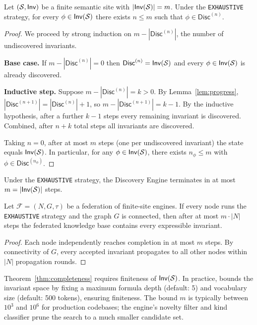 \documentclass[11pt]{article}
\newcommand{\Fed}{\mathcal{F}}             %
\newcommand{\Disc}{\mathsf{Disc}}          %
\newcommand{\Inv}{\mathsf{Inv}}            %
\newcommand{\alg}[1]{\texttt{\small #1}}   %
\begin{document}
\begin{theorem}\label{thm:completeness}
Let $(\Site, \Inv)$ be a finite semantic site with $|\Inv(\Site)| = m$.
Under the \alg{EXHAUSTIVE} strategy, for every $\phi \in \Inv(\Site)$
there exists $n \leq m$ such that $\phi \in \Disc^{(n)}$.
\end{theorem}
\begin{proof}
We proceed by strong induction on $m - |\Disc^{(n)}|$, the
number of undiscovered invariants.

\textbf{Base case.} If $m - |\Disc^{(n)}| = 0$ then
$\Disc^{(n)} = \Inv(\Site)$ and every $\phi \in \Inv(\Site)$ is
already discovered.

\textbf{Inductive step.} Suppose $m - |\Disc^{(n)}| = k > 0$.
By Lemma~\ref{lem:progress}, $|\Disc^{(n+1)}| = |\Disc^{(n)}| + 1$,
so $m - |\Disc^{(n+1)}| = k - 1$.  By the inductive hypothesis,
after a further $k - 1$ steps every remaining invariant is discovered.
Combined, after $n + k$ total steps all invariants are discovered.

Taking $n = 0$, after at most $m$ steps (one per undiscovered invariant)
the state equals $\Inv(\Site)$.  In particular, for any
$\phi \in \Inv(\Site)$, there exists $n_\phi \leq m$ with
$\phi \in \Disc^{(n_\phi)}$.
\end{proof}

\begin{corollary}\label{cor:termination}
Under the \alg{EXHAUSTIVE} strategy, the Discovery Engine terminates
in at most $m = |\Inv(\Site)|$ steps.
\end{corollary}

\begin{corollary}\label{cor:federation}
Let $\Fed = (N, G, \tau)$ be a federation of finite-site engines.
If every node runs the \alg{EXHAUSTIVE} strategy and the graph $G$
is connected, then after at most $m \cdot |N|$ steps the federated
knowledge base contains every expressible invariant.
\end{corollary}
\begin{proof}
Each node independently reaches completion in at most $m$ steps.
By connectivity of $G$, every accepted invariant propagates to all
other nodes within $|N|$ propagation rounds.
\end{proof}

\begin{remark}
Theorem~\ref{thm:completeness} requires finiteness of $\Inv(\Site)$.
In practice, \JuGeo{} bounds the invariant space by fixing a maximum
formula depth (default: 5) and vocabulary size (default: 500 tokens),
ensuring finiteness.  The bound $m$ is typically between $10^3$
and $10^6$ for production codebases; the engine's novelty filter
and kind classifier prune the search to a much smaller candidate set.
\end{remark}
\end{document}
